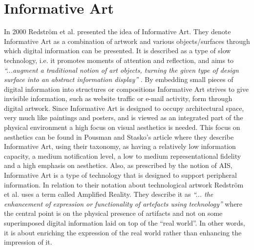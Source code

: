 \section{Informative Art}
In 2000 Redström et al. \cite{redstrom2000informative} presented the idea of Informative Art. They denote Informative Art as a combination of artwork and various objects/surfaces through which digital information can be presented. It is described as a type of slow technology, i.e. it promotes moments of attention and reflection, and aims to \emph{“...augment a traditional notion of art objects, turning the given type of design surface into an abstract information display”} \cite[p.~104]{redstrom2000informative}. By embedding small pieces of digital information into structures or compositions Informative Art strives to give invisible information, such as website traffic or e-mail activity, form through digital artwork. Since Informative Art is designed to occupy architectural space, very much like paintings and posters, and is viewed as an integrated part of the physical environment a high focus on visual aesthetics is needed. This focus on aesthetics can be found in Pousman and Stasko’s \cite{pousman2006taxonomy} article where they describe Informative Art, using their taxonomy, as having a relatively low information capacity, a medium notification level, a low to medium representational fidelity and a high emphasis on aesthetics. Also, as prescribed by the notion of AIS, Informative Art is a type of technology that is designed to support peripheral information. In relation to their notation about technological artwork Redström et al. uses a term called Amplified Reality. They describe it as \emph{“... the enhancement of expression or functionality of artefacts using technology”} \cite[p.~105]{pousman2006taxonomy} where the central point is on the physical presence of artifacts and not on some superimposed digital information laid on top of the “real world”. In other words, it is about enriching the expression of the real world rather than enhancing the impression of it.

